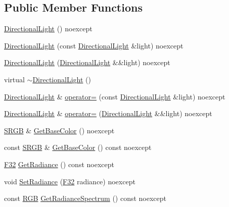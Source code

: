 \subsection*{Public Member Functions}
\begin{DoxyCompactItemize}
\item 
\hyperlink{classmage_1_1_directional_light_a688b26cb1d12d55258ae34bbac498465}{Directional\+Light} () noexcept
\item 
\hyperlink{classmage_1_1_directional_light_a0a89074b94178d9c3d7914d85ca5fdaa}{Directional\+Light} (const \hyperlink{classmage_1_1_directional_light}{Directional\+Light} \&light) noexcept
\item 
\hyperlink{classmage_1_1_directional_light_af2871e48659e62f8b5278cc0d601a4bc}{Directional\+Light} (\hyperlink{classmage_1_1_directional_light}{Directional\+Light} \&\&light) noexcept
\item 
virtual \hyperlink{classmage_1_1_directional_light_a967d33c11a1477c01ce4c9720337caeb}{$\sim$\+Directional\+Light} ()
\item 
\hyperlink{classmage_1_1_directional_light}{Directional\+Light} \& \hyperlink{classmage_1_1_directional_light_acf66f214974d9fb60844c16e02c49b22}{operator=} (const \hyperlink{classmage_1_1_directional_light}{Directional\+Light} \&light) noexcept
\item 
\hyperlink{classmage_1_1_directional_light}{Directional\+Light} \& \hyperlink{classmage_1_1_directional_light_a6affb7a9c6e9a509a2c80944d99b3506}{operator=} (\hyperlink{classmage_1_1_directional_light}{Directional\+Light} \&\&light) noexcept
\item 
\hyperlink{structmage_1_1_s_r_g_b}{S\+R\+GB} \& \hyperlink{classmage_1_1_directional_light_a7830f2407803a37512e94c0e2b6e7276}{Get\+Base\+Color} () noexcept
\item 
const \hyperlink{structmage_1_1_s_r_g_b}{S\+R\+GB} \& \hyperlink{classmage_1_1_directional_light_ab9e6a54f3e9b527674283e5678a86d29}{Get\+Base\+Color} () const noexcept
\item 
\hyperlink{namespacemage_aa97e833b45f06d60a0a9c4fc22ae02c0}{F32} \hyperlink{classmage_1_1_directional_light_a73fe73ce8184bf32379ead1e00b34c9f}{Get\+Radiance} () const noexcept
\item 
void \hyperlink{classmage_1_1_directional_light_ac8b63948d393696ca8745c799328be84}{Set\+Radiance} (\hyperlink{namespacemage_aa97e833b45f06d60a0a9c4fc22ae02c0}{F32} radiance) noexcept
\item 
const \hyperlink{structmage_1_1_r_g_b}{R\+GB} \hyperlink{classmage_1_1_directional_light_a137cef14d20df2c907884a04ae2019ff}{Get\+Radiance\+Spectrum} () const noexcept

\end{DoxyCompactItemize}
